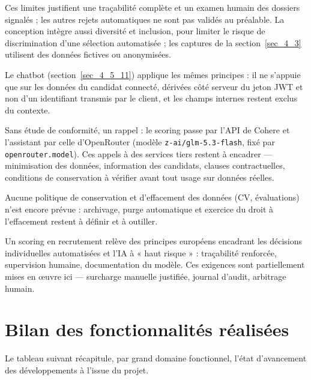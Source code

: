 \documentclass[]{./tpl/isipfe}
\begin{document}
Ces limites justifient une traçabilité complète et un examen humain des dossiers signalés ; les autres rejets automatiques ne sont pas validés au préalable. La conception intègre aussi diversité et inclusion, pour limiter le risque de discrimination d’une sélection automatisée \cite{ref19} ; les captures de la section~\ref{sec_4_3} utilisent des données fictives ou anonymisées.

Le chatbot (section~\ref{sec_4_5_11}) applique les mêmes principes : il ne s’appuie que sur les données du candidat connecté, dérivées côté serveur du jeton JWT et non d’un identifiant transmis par le client, et les champs internes restent exclus du contexte.

Sans étude de conformité, un rappel : le scoring passe par l’API de Cohere et l’assistant par celle d’OpenRouter (modèle \texttt{z-ai/glm-5.3-flash}, fixé par \texttt{openrouter.model}). Ces appels à des services tiers restent à encadrer — minimisation des données, information des candidats, clauses contractuelles, conditions de conservation à vérifier avant tout usage sur données réelles.

Aucune politique de conservation et d’effacement des données (CV, évaluations) n’est encore prévue : archivage, purge automatique et exercice du droit à l’effacement restent à définir et à outiller.

Un scoring en recrutement relève des principes européens encadrant les décisions individuelles automatisées \cite{ref17,ref18} et l’IA à « haut risque » \cite{ref20} : traçabilité renforcée, supervision humaine, documentation du modèle. Ces exigences sont partiellement mises en œuvre ici — surcharge manuelle justifiée, journal d’audit, arbitrage humain.

\section{Bilan des fonctionnalités réalisées}
\label{sec_4_7}
\begingroup
\setlength{\emergencystretch}{4em}
Le tableau suivant récapitule, par grand domaine fonctionnel, l’état d’avancement des développements à l’issue du projet.
\par\endgroup
\end{document}
